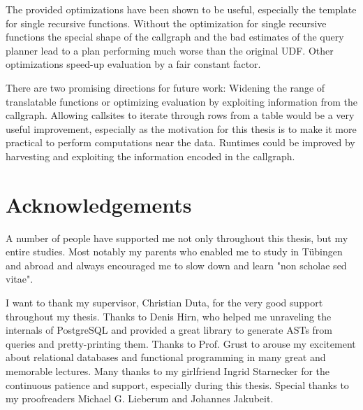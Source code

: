 The provided optimizations have been shown to be useful, especially the template for single recursive functions. Without the optimization for single recursive functions the special shape of the callgraph and the bad estimates of the query planner lead to a plan performing much worse than the original UDF. Other optimizations speed-up evaluation by a fair constant factor.

There are two promising directions for future work: Widening the range of translatable functions or optimizing evaluation by exploiting information from the callgraph. Allowing callsites to iterate through rows from a table would be a very useful improvement, especially as the motivation for this thesis is to make it more practical to perform computations near the data. Runtimes could be improved by harvesting and exploiting the information encoded in the callgraph.

\section*{Acknowledgements}
A number of people have supported me not only throughout this thesis, but my entire studies. Most notably my parents who enabled me to study in Tübingen and abroad and always encouraged me to slow down and learn "non scholae sed vitae".

I want to thank my supervisor, Christian Duta, for the very good support throughout my thesis. Thanks to Denis Hirn, who helped me unraveling the internals of PostgreSQL and provided a great library to generate ASTs from queries and pretty-printing them. Thanks to Prof. Grust to arouse my excitement about relational databases and functional programming in many great and memorable lectures. 
Many thanks to my girlfriend Ingrid Starnecker for the continuous patience and support, especially during this thesis. Special thanks to my proofreaders Michael G. Lieberum and Johannes Jakubeit.